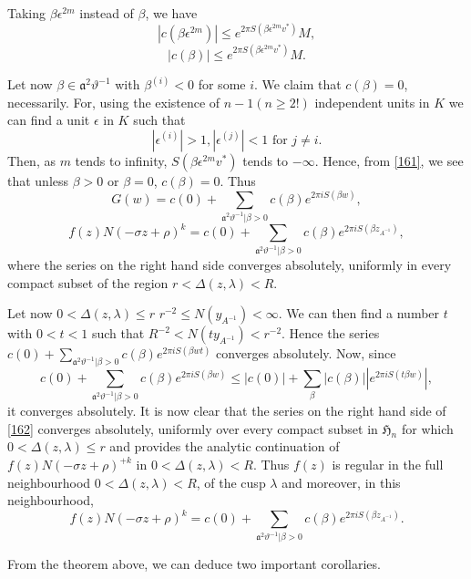 Taking $\beta\epsilon^{2m}$ instead of $\beta$, we have
$$
|c(\beta\epsilon^{2m})|\leq e^{2\pi S(\beta\epsilon^{2m}v^{\ast})}M,
$$
\ie
\begin{equation*}
|c(\beta)|\leq e^{2\pi S(\beta\epsilon^{2m}v^{\ast})}M.\tag{161}\label{161}
\end{equation*}

Let now $\beta\in \mathfrak{a}^{2}\vartheta^{-1}$ with $\beta^{(i)}<0$
for some $i$. We claim that $c(\beta)=0$, necessarily. For, using the
existence of $n-1(n\geq 2!)$ independent units in $K$ we can find a
unit $\epsilon$ in $K$ such that
$$
|\epsilon^{(i)}|>1,|\epsilon^{(j)}|<1\text{ \ for \ } j\neq i.
$$\pageoriginale 
Then, as $m$ tends to infinity, $S(\beta\epsilon^{2m}v^{\ast})$ tends
to $-\infty$. Hence, from \eqref{161}, we see that unless $\beta>0$ or
$\beta=0$, $c(\beta)=0$. Thus
$$
G(w)=c(0)+\sum_{\mathfrak{a}^{2}\vartheta^{-1}|\beta>0}c(\beta)e^{2\pi
  iS(\beta w)},
$$
\ie
\begin{equation*}
f(z)N(-\sigma
z+\rho)^{k}=c(0)+\sum_{\mathfrak{a}^{2}\vartheta^{-1}|\beta>0}c(\beta)e^{2\pi
  iS(\beta z_{A^{-1}})},\tag{162}\label{162} 
\end{equation*}
where the series on the right hand side converges absolutely,
uniformly in every compact subset of the region
$r<\Delta(z,\lambda)<R$.

Let now $0<\Delta(z,\lambda)\leq r$ \ie $r^{-2}\leq
N(y_{A^{-1}})<\infty$. We can then find a number $t$ with $0<t<1$ such
that $R^{-2}<N(ty_{A^{-1}})<r^{-2}$. Hence the series
$c(0)+\sum\limits_{\mathfrak{a}^{2}\vartheta^{-1}|\beta>0}c(\beta)e^{2\pi
  iS(\beta wt)}$ converges absolutely. Now, since
$$
c(0)+\sum_{\mathfrak{a}^{2}\vartheta^{-1}|\beta>0}c(\beta)e^{2\pi
  iS(\beta w)}\leq |c(0)|+\sum_{\beta}|c(\beta)||e^{2\pi iS(t\beta
  w)}|,
$$
it converges absolutely. It is now clear that the series on the right
hand side of \eqref{162} converges absolutely, uniformly over every
compact subset in $\mathfrak{H}_{n}$ for which
$0<\Delta(z,\lambda)\leq r$ and provides the analytic continuation of
$f(z)N(-\sigma z+\rho)^{+k}$ in $0<\Delta(z,\lambda)<R$. Thus $f(z)$
is regular in the full neighbourhood $0<\Delta(z,\lambda)<R$, of the
cusp $\lambda$ and moreover, in this neighbourhood,
\begin{equation*}
f(z)N(-\sigma
z+\rho)^{k}=c(0)+\sum_{\mathfrak{a}^{2}\vartheta^{-1}|\beta>0}c(\beta)e^{2\pi
  iS(\beta z_{A^{-1}})}.\tag{163}\label{163}
\end{equation*}

From the theorem above, we can deduce two important corollaries.

